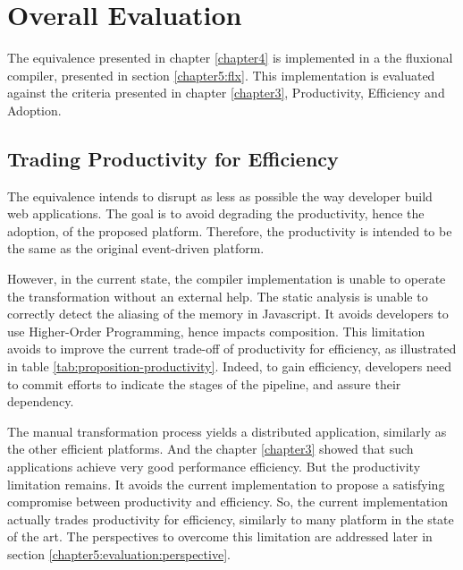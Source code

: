 \section{Overall Evaluation} \label{chapter6:evaluation}

The equivalence presented in chapter \ref{chapter4} is implemented in a the fluxional compiler, presented in section \ref{chapter5:flx}.
This implementation is evaluated against the criteria presented in chapter \ref{chapter3}, Productivity, Efficiency and Adoption.

\subsection{Trading Productivity for Efficiency}


The equivalence intends to disrupt as less as possible the way developer build web applications.
The goal is to avoid degrading the productivity, hence the adoption, of the proposed platform.
Therefore, the productivity is intended to be the same as the original event-driven platform.

However, in the current state, the compiler implementation is unable to operate the transformation without an external help.
The static analysis is unable to correctly detect the aliasing of the memory in Javascript.
It avoids developers to use Higher-Order Programming, hence impacts composition.
This limitation avoids to improve the current trade-off of productivity for efficiency, as illustrated in table \ref{tab:proposition-productivity}.
Indeed, to gain efficiency, developers need to commit efforts to indicate the stages of the pipeline, and assure their dependency.


The manual transformation process yields a distributed application, similarly as the other efficient platforms.
And the chapter \ref{chapter3} showed that such applications achieve very good performance efficiency.
But the productivity limitation remains.
It avoids the current implementation to propose a satisfying compromise between productivity and efficiency.
So, the current implementation actually trades productivity for efficiency, similarly to many platform in the state of the art. %
The perspectives to overcome this limitation are addressed later in section \ref{chapter5:evaluation:perspective}.


